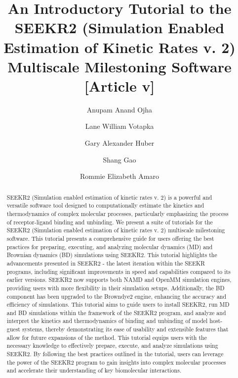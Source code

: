 \documentclass[9pt,training,pubversion]{livecoms}
\title{An Introductory Tutorial to the SEEKR2 (Simulation Enabled Estimation of Kinetic Rates v. 2) Multiscale Milestoning Software [Article v\versionnumber]}
\author[1*]{Anupam Anand Ojha}
\author[1]{Lane William Votapka}
\author[1]{Gary Alexander Huber}
\author[1]{Shang Gao}
\author[2*]{Rommie Elizabeth Amaro}
\affil[1]{Department of Chemistry and Biochemistry, University of California San Diego, La Jolla, California, 92093, United States}
\affil[2]{Department of Molecular Biology, University of California San Diego, La Jolla, California, 92093, United States}
\begin{document}
\begin{frontmatter}
\maketitle
\begin{abstract}

SEEKR2 (Simulation enabled estimation of kinetic rates v. 2) is a powerful and versatile software tool designed to computationally estimate the kinetics and thermodynamics of complex molecular processes, particularly emphasizing the process of receptor-ligand binding and unbinding. We present a suite of tutorials for the SEEKR2 (Simulation enabled estimation of kinetic rates v. 2) multiscale milestoning software. This tutorial presents a comprehensive guide for users offering the best practices for preparing, executing, and analyzing molecular dynamics (MD) and Brownian dynamics (BD) simulations using SEEKR2. This tutorial highlights the advancements presented in SEEKR2 - the latest iteration within the SEEKR programs, including significant improvements in speed and capabilities compared to its earlier versions. SEEKR2 now supports both NAMD and OpenMM simulation engines, providing users with more flexibility in their simulation setups. Additionally, the BD component has been upgraded to the Browndye2 engine, enhancing the accuracy and efficiency of simulations. This tutorial aims to guide users to install SEEKR2, run MD and BD simulations within the framework of the SEEKR2 program, and analyze and interpret the kinetics and thermodynamics of binding and unbinding of model host-guest systems, thereby demonstrating its ease of usability and extensible features that allow for future expansions of the method. This tutorial equips users with the necessary knowledge to effectively prepare, execute, and analyze simulations using SEEKR2. By following the best practices outlined in the tutorial, users can leverage the power of the SEEKR2 program to gain insights into complex molecular processes and accelerate their understanding of key biomolecular interactions. 

\end{abstract}

\end{frontmatter}
\end{document}
